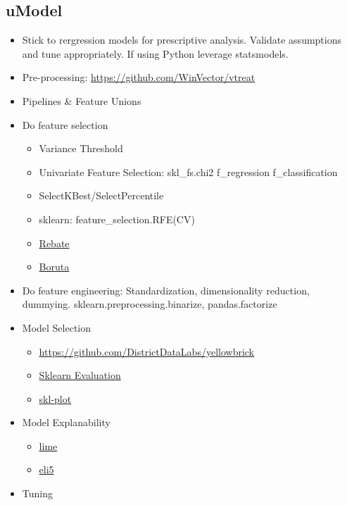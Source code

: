 \documentclass[]{book}
\providecommand{\tightlist}{%
  \setlength{\itemsep}{0pt}\setlength{\parskip}{0pt}}
\theoremstyle{definition}
\theoremstyle{definition}
\theoremstyle{definition}
\theoremstyle{remark}
\begin{document}
\subsection{uModel}\label{umodel}

\begin{itemize}
\item
  Stick to rergression models for prescriptive analysis. Validate
  assumptions and tune appropriately. If using Python leverage
  statsmodels.
\item
  Pre-processing: \url{https://github.com/WinVector/vtreat}
\item
  Pipelines \& Feature Unions
\item
  Do feature selection

  \begin{itemize}
  \tightlist
  \item
    Variance Threshold
  \item
    Univariate Feature Selection: skl\_fs.chi2 \textbar{} f\_regression
    \textbar{} f\_classification
  \item
    SelectKBest/SelectPercentile
  \item
    sklearn: feature\_selection.RFE(CV)
  \item
    \href{https://github.com/EpistasisLab/scikit-rebate}{Rebate}
  \item
    \href{https://github.com/scikit-learn-contrib/boruta_py}{Boruta}
  \end{itemize}
\item
  Do feature engineering: Standardization, dimensionality reduction,
  dummying. sklearn.preprocessing.binarize, pandas.factorize
\item
  Model Selection

  \begin{itemize}
  \tightlist
  \item
    \url{https://github.com/DistrictDataLabs/yellowbrick}
  \item
    \href{https://edublancas.github.io/sklearn-evaluation/}{Sklearn
    Evaluation}
  \item
    \href{https://github.com/reiinakano/scikit-plot}{skl-plot}
  \end{itemize}
\item
  Model Explanability

  \begin{itemize}
  \tightlist
  \item
    \href{https://github.com/marcotcr/lime}{lime}
  \item
    \href{https://github.com/TeamHG-Memex/eli5}{eli5}
  \end{itemize}
\item
  Tuning


\end{itemize}
\end{document}
